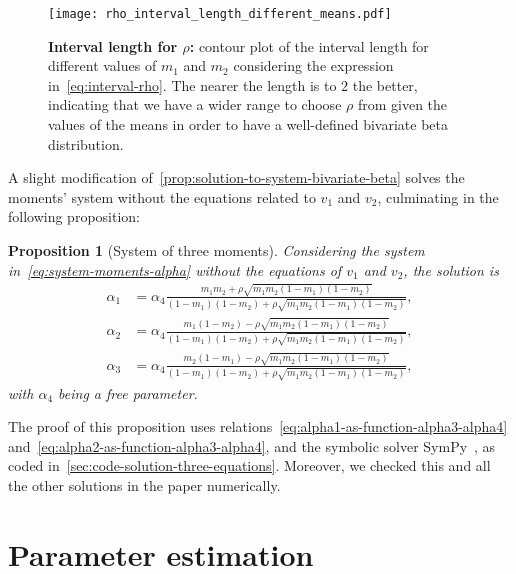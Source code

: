 \documentclass[a4paper, notitlepage, 10pt]{article}
\newtheorem{proposition}{Proposition}[]
\theoremstyle{definition}
\begin{document}
\begin{figure}[!htbp]
    \centering
    \texttt{[image: rho\_interval\_length\_different\_means.pdf]}
    \caption{{\bf Interval length for $\rho$:} contour plot of the interval length for different values of $m_1$ and $m_2$ considering the expression in~\eqref{eq:interval-rho}.
    The nearer the length is to $2$ the better, indicating that we have a wider range to choose $\rho$ from given the values of the means in order to have a well-defined bivariate beta distribution. 
    }\label{fig:rho_interval_length}
\end{figure}

A slight modification of~\autoref{prop:solution-to-system-bivariate-beta} solves the moments' system without the equations related to $v_1$ and $v_2$, culminating in the following proposition:

\begin{proposition}[System of three moments]\label{prop:system-three-moments}
    Considering the system in~\eqref{eq:system-moments-alpha} without the equations of $v_1$ and $v_2$, the solution is 
    \begin{equation}
      \label{eq:system-three-solution}
      \begin{aligned}
        \alpha_1 &= \alpha_4\frac{m_1m_2 + \rho\sqrt{m_1m_2(1-m_1)(1-m_2)}}{(1-m_1)(1-m_2) + \rho\sqrt{m_1m_2(1-m_1)(1-m_2)}}, \\
        \alpha_2 &= \alpha_4\frac{m_1(1-m_2) - \rho\sqrt{m_1m_2(1-m_1)(1-m_2)}}{(1-m_1)(1-m_2) + \rho\sqrt{m_1m_2(1-m_1)(1-m_2)}}, \\
        \alpha_3 &= \alpha_4\frac{m_2(1-m_1) - \rho\sqrt{m_1m_2(1-m_1)(1-m_2)}}{(1-m_1)(1-m_2) + \rho\sqrt{m_1m_2(1-m_1)(1-m_2)}},
      \end{aligned}
    \end{equation}
    with $\alpha_4$ being a free parameter.
\end{proposition}

The proof of this proposition uses relations~\eqref{eq:alpha1-as-function-alpha3-alpha4} and~\eqref{eq:alpha2-as-function-alpha3-alpha4}, and the symbolic solver SymPy~\cite[]{sympy}, as coded in~\autoref{sec:code-solution-three-equations}.
Moreover, we checked this and all the other solutions in the paper numerically.

\section{Parameter estimation}\label{sec:estimation}
\end{document}
